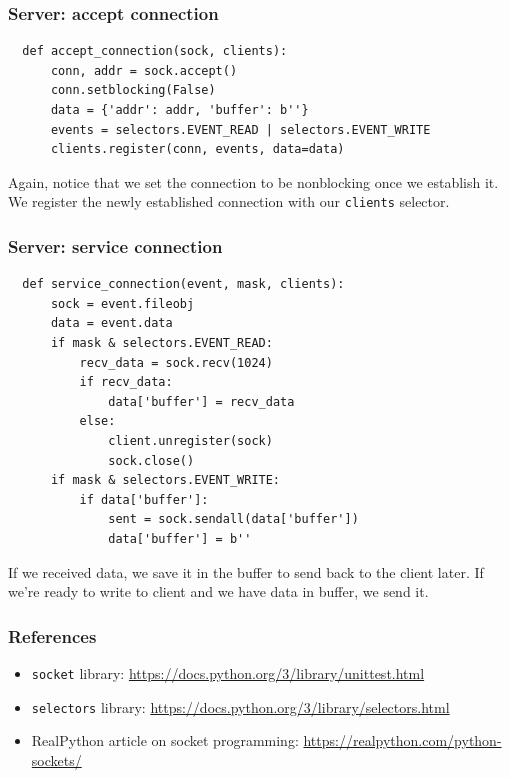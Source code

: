 \documentclass[10pt]{beamer}
\begin{document}
\begin{frame}[fragile]
  \frametitle{Server: accept connection}
  
 
  
  \begin{verbatim}
  def accept_connection(sock, clients):
      conn, addr = sock.accept()
      conn.setblocking(False)
      data = {'addr': addr, 'buffer': b''}
      events = selectors.EVENT_READ | selectors.EVENT_WRITE
      clients.register(conn, events, data=data)                   
  \end{verbatim} 
  
  Again, notice that we set the connection to be nonblocking once we establish it. We 
  register the newly established connection  with our \texttt{clients} selector.
   
\end{frame}

\begin{frame}[fragile]
  \frametitle{Server: service connection}
  
 
  
  \begin{verbatim}
  def service_connection(event, mask, clients):
      sock = event.fileobj
      data = event.data
      if mask & selectors.EVENT_READ:
          recv_data = sock.recv(1024)
          if recv_data:
              data['buffer'] = recv_data
          else:
              client.unregister(sock)
              sock.close()
      if mask & selectors.EVENT_WRITE:
          if data['buffer']:
              sent = sock.sendall(data['buffer'])   
              data['buffer'] = b''          
  \end{verbatim} 
  
  If we received data, we save it in the buffer to send back to the client later. If 
  we're ready to write to client and we have data in buffer, we send it.
   
\end{frame}
\begin{frame}
  \frametitle{References}
  
  \begin{itemize}
    \item \texttt{socket} library: \url{https://docs.python.org/3/library/unittest.html}
    \item \texttt{selectors} library: \url{https://docs.python.org/3/library/selectors.html}
    \item RealPython article on socket programming: \url{https://realpython.com/python-sockets/}
  \end{itemize}      
\end{frame}
\end{document}

